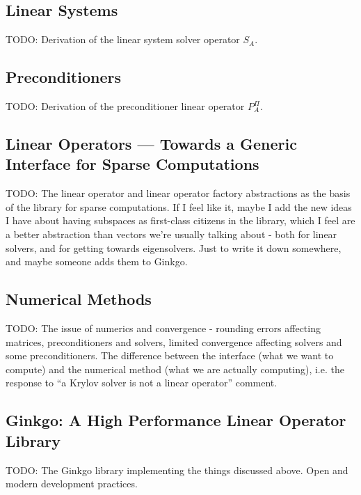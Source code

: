 \subsection{Linear Systems}
TODO: Derivation of the linear system solver operator $S_A$.

\subsection{Preconditioners}
TODO: Derivation of the preconditioner linear operator $P^\Pi_A$.
\subsection{Linear Operators --- Towards a Generic Interface for Sparse
            Computations}
TODO: The linear operator and linear operator factory abstractions as the basis
      of the library for sparse computations.
      If I feel like it, maybe I add the new ideas I have about having subspaces
      as first-class citizens in the library, which I feel are a better
      abstraction than vectors we're usually talking about - both for linear
      solvers, and for getting towards eigensolvers. Just to write it down
      somewhere, and maybe someone adds them to Ginkgo.
\subsection{Numerical Methods}
TODO: The issue of numerics and convergence - rounding errors affecting
matrices, preconditioners and solvers, limited convergence affecting solvers and
some preconditioners. The difference between the interface (what we want to
compute) and the numerical method (what we are actually computing), i.e. the
response to ``a Krylov solver is not a linear operator'' comment.

\subsection{Ginkgo: A High Performance Linear Operator Library}
TODO: The Ginkgo library implementing the things discussed above. Open and
modern development practices.

